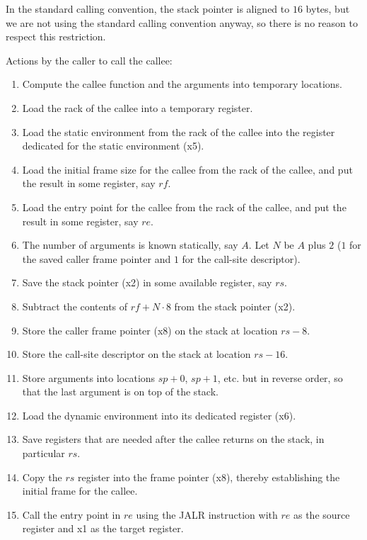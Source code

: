 In the standard \riscv{} calling convention, the stack pointer is
aligned to $16$ bytes, but we are not using the standard \riscv{}
calling convention anyway, so there is no reason to respect this
restriction.

Actions by the caller to call the callee:

\begin{enumerate}
\item Compute the callee function and the arguments into temporary
  locations.
\item Load the rack of the callee into a temporary register.
\item Load the static environment from the rack of the callee into the
  register dedicated for the static environment (x5).
\item Load the initial frame size for the callee from the rack of the
  callee, and put the result in some register, say $rf$.
\item Load the entry point for the callee from the rack of the callee,
  and put the result in some register, say $re$.
\item The number of arguments is known statically, say $A$.  Let $N$
  be $A$ plus $2$ ($1$ for the saved caller frame pointer and $1$ for
  the call-site descriptor).
\item Save the stack pointer (x2) in some available register, say $rs$.
\item Subtract the contents of $rf + N \cdot 8$ from the stack
  pointer (x2).
\item Store the caller frame pointer (x8) on the stack at location $rs
  - 8$.
\item Store the call-site descriptor on the stack at location $rs -
  16$.
\item Store arguments into locations $sp +  0$, $sp +  1$, etc. but in
  reverse order, so that the last argument is on top of the stack.
\item Load the dynamic environment into its dedicated register (x6).
\item Save registers that are needed after the callee returns on the
  stack, in particular $rs$.
\item Copy the $rs$ register into the frame pointer (x8), thereby
  establishing the initial frame for the callee.
\item Call the entry point in $re$ using the JALR instruction with
  $re$ as the source register and x1 as the target register.
\end{enumerate}

